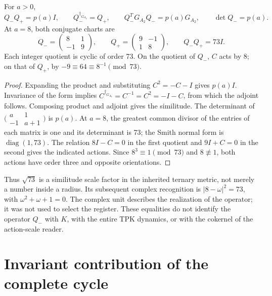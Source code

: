 \begin{proposition}
\label{x_reciprocidad:lib02:norma-A2}
For \(a>0\),
\[
 Q_-Q_+=p(a)I,\qquad Q_-^{\dagger_{G_{A_2}}}=Q_+,
 \qquad Q_-^TG_{A_2}Q_-=p(a)G_{A_2},\qquad \det Q_-=p(a).
\]
At \(a=8\), both conjugate charts are
\[
 Q_-=
 \begin{pmatrix}8&1\\-1&9\end{pmatrix},\qquad
 Q_+=\begin{pmatrix}9&-1\\1&8\end{pmatrix},\qquad Q_-Q_+=73I.
\]
Each integer quotient is cyclic of order 73. On the quotient of \(Q_-\), \(C\) acts by \(8\); on that of \(Q_+\), by \(-9\equiv64\equiv8^{-1}\pmod{73}\).
\end{proposition}
\begin{proof}
Expanding the product and substituting \(C^2=-C-I\) gives \(p(a)I\). Invariance of the form implies \(C^{\dagger_{G_{A_2}}}=C^{-1}=C^2=-I-C\), from which the adjoint follows. Composing product and adjoint gives the similitude. The determinant of \(\bigl(\begin{smallmatrix}a&1\\-1&a+1\end{smallmatrix}\bigr)\) is \(p(a)\). At \(a=8\), the greatest common divisor of the entries of each matrix is one and its determinant is 73; the Smith normal form is \(\operatorname{diag}(1,73)\). The relation \(8I-C=0\) in the first quotient and \(9I+C=0\) in the second gives the indicated actions. Since \(8^3\equiv1\pmod{73}\) and \(8\not\equiv1\), both actions have order three and opposite orientations.
\end{proof}

Thus \(\sqrt{73}\) is a similitude scale factor in the inherited ternary metric, not merely a number inside a radius. Its subsequent complex recognition is \(|8-\omega|^2=73\), with \(\omega^2+\omega+1=0\). The complex unit describes the realization of the operator; it was not used to select the register. These equalities do not identify the operator \(Q_-\) with \(K\), with the entire TPK dynamics, or with the cokernel of the action-scale reader.

\section{Invariant contribution of the complete cycle}
\label{x_reciprocidad:lib02:ciclo-completo}

